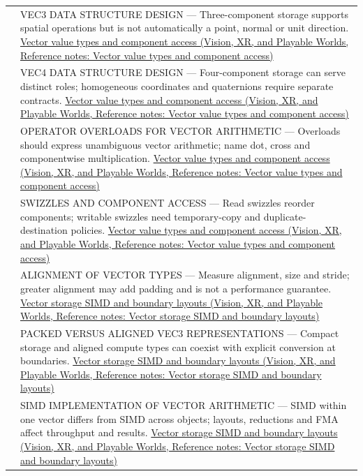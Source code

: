 {\begin{longtable}[]{@{}
  >{\raggedright\arraybackslash}p{}
  >{\raggedright\arraybackslash}p{}@{}}
589 & VEC3 DATA STRUCTURE DESIGN --- Three-component storage supports spatial operations but is not automatically a point, normal or unit direction. \href{../07-Vision-XR-and-Playable-Worlds/main.pdf\#nameddest=appendix-37a39984ba66}{Vector value types and component access (Vision, XR, and Playable Worlds, Reference notes: Vector value types and component access)} \\
590 & VEC4 DATA STRUCTURE DESIGN --- Four-component storage can serve distinct roles; homogeneous coordinates and quaternions require separate contracts. \href{../07-Vision-XR-and-Playable-Worlds/main.pdf\#nameddest=appendix-37a39984ba66}{Vector value types and component access (Vision, XR, and Playable Worlds, Reference notes: Vector value types and component access)} \\
591 & OPERATOR OVERLOADS FOR VECTOR ARITHMETIC --- Overloads should express unambiguous vector arithmetic; name dot, cross and componentwise multiplication. \href{../07-Vision-XR-and-Playable-Worlds/main.pdf\#nameddest=appendix-37a39984ba66}{Vector value types and component access (Vision, XR, and Playable Worlds, Reference notes: Vector value types and component access)} \\
592 & SWIZZLES AND COMPONENT ACCESS --- Read swizzles reorder components; writable swizzles need temporary-copy and duplicate-destination policies. \href{../07-Vision-XR-and-Playable-Worlds/main.pdf\#nameddest=appendix-37a39984ba66}{Vector value types and component access (Vision, XR, and Playable Worlds, Reference notes: Vector value types and component access)} \\
593 & ALIGNMENT OF VECTOR TYPES --- Measure alignment, size and stride; greater alignment may add padding and is not a performance guarantee. \href{../07-Vision-XR-and-Playable-Worlds/main.pdf\#nameddest=appendix-26bf6bf2fb8b}{Vector storage SIMD and boundary layouts (Vision, XR, and Playable Worlds, Reference notes: Vector storage SIMD and boundary layouts)} \\
594 & PACKED VERSUS ALIGNED VEC3 REPRESENTATIONS --- Compact storage and aligned compute types can coexist with explicit conversion at boundaries. \href{../07-Vision-XR-and-Playable-Worlds/main.pdf\#nameddest=appendix-26bf6bf2fb8b}{Vector storage SIMD and boundary layouts (Vision, XR, and Playable Worlds, Reference notes: Vector storage SIMD and boundary layouts)} \\
595 & SIMD IMPLEMENTATION OF VECTOR ARITHMETIC --- SIMD within one vector differs from SIMD across objects; layouts, reductions and FMA affect throughput and results. \href{../07-Vision-XR-and-Playable-Worlds/main.pdf\#nameddest=appendix-26bf6bf2fb8b}{Vector storage SIMD and boundary layouts (Vision, XR, and Playable Worlds, Reference notes: Vector storage SIMD and boundary layouts)} \\

\end{longtable}}
